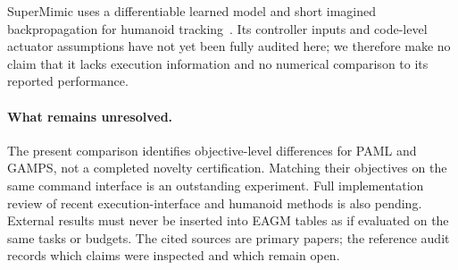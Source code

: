 SuperMimic uses a differentiable learned model and short imagined backpropagation for humanoid tracking~\cite{supermimic}. Its controller inputs and code-level actuator assumptions have not yet been fully audited here; we therefore make no claim that it lacks execution information and no numerical comparison to its reported performance.

\paragraph{What remains unresolved.}
The present comparison identifies objective-level differences for PAML and GAMPS, not a completed novelty certification. Matching their objectives on the same command interface is an outstanding experiment. Full implementation review of recent execution-interface and humanoid methods is also pending. External results must never be inserted into EAGM tables as if evaluated on the same tasks or budgets. The cited sources are primary papers; the reference audit records which claims were inspected and which remain open.
